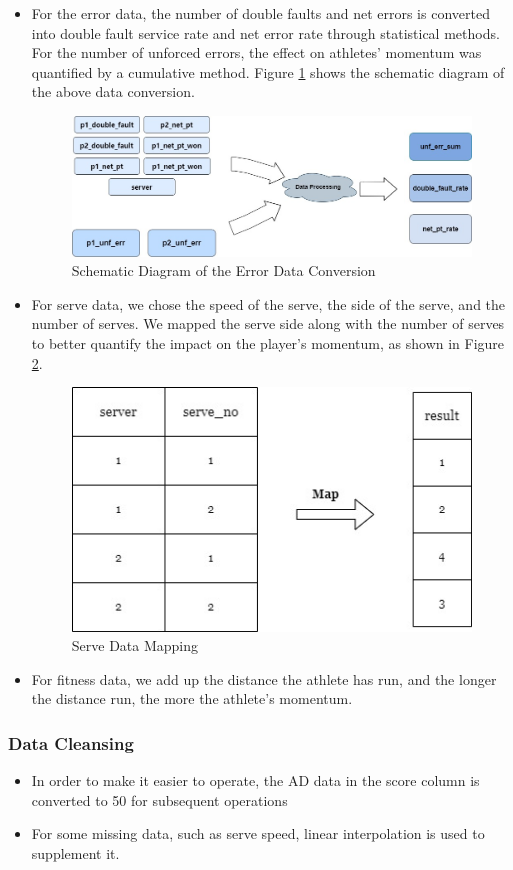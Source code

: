 \begin{itemize}
    \item For the error data, the number of double faults and net errors is converted into double fault service rate and net error rate through statistical methods. For the number of unforced errors, the effect on athletes' momentum was quantified by a cumulative method. Figure \ref{fig:Edeal} shows the schematic diagram of the above data conversion.
    \begin{figure}[bt!]
        \centering
        \includegraphics[width=0.75\linewidth]{figure/失误数据.jpg}
        \caption{\centering Schematic Diagram of the Error Data Conversion}
        \label{fig:Edeal}
    \end{figure}
    \item For serve data, we chose the speed of the serve, the side of the serve, and the number of serves. We mapped the serve side along with the number of serves to better quantify the impact on the player's momentum, as shown in Figure \ref{fig:Sdeal}.
    \begin{figure}[bt!]
        \centering
        \includegraphics[width=0.5\linewidth]{figure/发球数据.jpg}
        \caption{\centering Serve Data Mapping}
        \label{fig:Sdeal}
    \end{figure}
    \item For fitness data, we add up the distance the athlete has run, and the longer the distance run, the more the athlete's momentum.
\end{itemize}
\subsubsection{Data Cleansing}
\begin{itemize}
    \item In order to make it easier to operate, the AD data in the score column is converted to 50 for subsequent operations
    \item For some missing data, such as serve speed, linear interpolation is used to supplement it.
\end{itemize}




